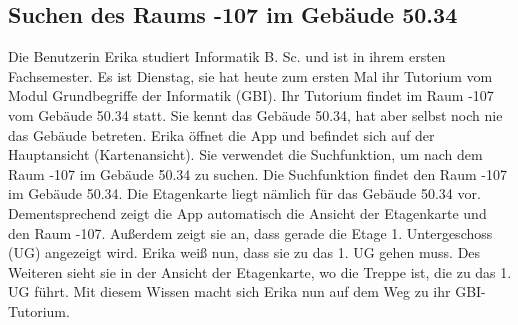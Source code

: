 \subsection{Suchen des Raums -107 im Gebäude 50.34}

Die Benutzerin Erika studiert Informatik B. Sc. und ist in ihrem ersten Fachsemester.
Es ist Dienstag, sie hat heute zum ersten Mal ihr Tutorium vom Modul Grundbegriffe der Informatik (GBI).
Ihr Tutorium findet im Raum -107 vom Gebäude 50.34 statt.
Sie kennt das Gebäude 50.34, hat aber selbst noch nie das Gebäude betreten.
Erika öffnet die App und befindet sich auf der Hauptansicht (Kartenansicht).
Sie verwendet die Suchfunktion, um nach dem Raum -107 im Gebäude 50.34 zu suchen.
Die Suchfunktion findet den Raum -107 im Gebäude 50.34.
Die Etagenkarte liegt nämlich für das Gebäude 50.34 vor.
Dementsprechend zeigt die App automatisch die Ansicht der Etagenkarte und den Raum -107.
Außerdem zeigt sie an, dass gerade die Etage 1. Untergeschoss (UG) angezeigt wird.
Erika weiß nun, dass sie zu das 1. UG gehen muss.
Des Weiteren sieht sie in der Ansicht der Etagenkarte, wo die Treppe ist, die zu das 1. UG führt.
Mit diesem Wissen macht sich Erika nun auf dem Weg zu ihr GBI-Tutorium.